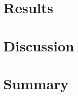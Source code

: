 \documentclass[10pt,conference,compsocconf]{IEEEtran}
\begin{document}



\section{Results}
\label{S4}

\section{Discussion}
\label{S5}

\section{Summary}
\label{S6}



\end{document}
